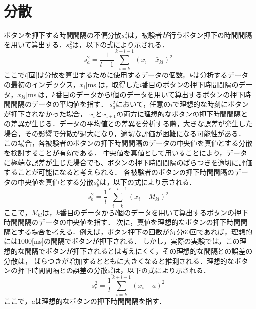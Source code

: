 \section{分散}
ボタンを押下する時間間隔の不偏分散$s^2_{a}$は，被験者が行うボタン押下の時間間隔を用いて算出する．$s^2_{a}$は，以下の式により示される．
\begin{equation}
  s^2_a = \frac{1}{l-1} \sum_{i=k}^{k+l-1} (x_i - \bar{x}_{kl})^2
\end{equation}
ここで$l$[回]は分散を算出するために使用するデータの個数，$k$は分析するデータの最初のインデックス，$x_{i}$[ms]は，取得した$i$番目のボタンの押下時間間隔のデータ，$\bar{x}_{kl}$[ms]は，$k$番目のデータから$l$個のデータを用いて算出するボタンの押下時間間隔のデータの平均値を指す．
$s^2_{a}$において，任意の$i$で理想的な時刻にボタンが押下されなかった場合，
$x_{i}$と$x_{i+1}$の両方に理想的なボタンの押下時間間隔との差異が生じる．データの平均値との差異を分析する際，大きな誤差が発生した場合，その影響で分散が過大になり，適切な評価が困難になる可能性がある．
この場合，各被験者のボタンの押下時間間隔のデータの中央値を真値とする分散を検討することが有効である．
中央値を真値として用いることにより，データに極端な誤差が生じた場合でも、ボタンの押下時間間隔のばらつきを適切に評価することが可能になると考えられる．
各被験者のボタンの押下時間間隔のデータの中央値を真値とする分散$s^2_{b}$は，以下の式により示される．
\begin{equation}
  s^2_b = \frac{1}{l} \sum_{i=k}^{k+l-1} (x_i - M_{kl})^2
\end{equation}
ここで，$M_{kl}$は，$k$番目のデータから$l$個のデータを用いて算出するボタンの押下時間間隔のデータの中央値を指す．
次に，真値を理想的なボタンの押下時間間隔とする場合を考える．例えば，ボタン押下の回数が毎分60回であれば，理想的には1000[ms]の間隔でボタンが押下される．
しかし，実際の実験では，この理想的な間隔でボタンが押下されるとは考えにくく，その理想的な間隔との誤差の分散は，
ばらつきが増加するとともに大きくなると推測される．理想的なボタンの押下時間間隔との誤差の分散$s^2_{c}$は，以下の式により示される．
\begin{equation}
  s^2_c = \frac{1}{l} \sum_{i=k}^{k+l-1} (x_i - a)^2
\end{equation}
ここで，$a$は理想的なボタンの押下時間間隔を指す．

